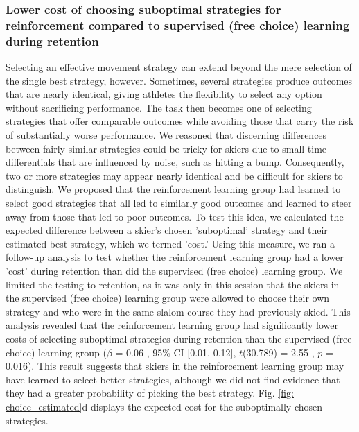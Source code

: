\documentclass[pdflatex,sn-nature]{sn-jnl}%
\theoremstyle{thmstyleone}%
\theoremstyle{thmstyletwo}%
\theoremstyle{thmstylethree}%
\begin{document}
\subsubsection{Lower cost of choosing suboptimal strategies for reinforcement compared to supervised (free choice) learning during retention}\label{result_strategychoice_regret}
Selecting an effective movement strategy can extend beyond the mere selection of the single best strategy, however. Sometimes, several strategies produce outcomes that are nearly identical, giving athletes the flexibility to select any option without sacrificing performance. The task then becomes one of selecting strategies that offer comparable outcomes while avoiding those that carry the risk of substantially worse performance. We reasoned that discerning differences between fairly similar strategies could be tricky for skiers due to small time differentials that are influenced by noise, such as hitting a bump. Consequently, two or more strategies may appear nearly identical and be difficult for skiers to distinguish. We proposed that the reinforcement learning group had learned to select good strategies that all led to similarly good outcomes and learned to steer away from those that led to poor outcomes. To test this idea, we calculated the expected difference between a skier's chosen 'suboptimal' strategy and their estimated best strategy, which we termed 'cost.' Using this measure, we ran a follow-up analysis to test whether the reinforcement learning group had a lower 'cost' during retention than did the supervised (free choice) learning group. We limited the testing to retention, as it was only in this session that the skiers in the supervised (free choice) learning group were allowed to choose their own strategy and who were in the same slalom course they had previously skied. This analysis revealed that the reinforcement learning group had significantly lower costs of selecting suboptimal strategies during retention than the supervised (free choice) learning group ($\beta$ = 0.06 , 95\% CI [0.01, 0.12], $t$(30.789) = 2.55 , $p$ = 0.016). This result suggests that skiers in the reinforcement learning group may have learned to select better strategies, although we did not find evidence that they had a greater probability of picking the best strategy. Fig. \ref{fig: choice_estimated}d displays the expected cost for the suboptimally chosen strategies.
\end{document}
